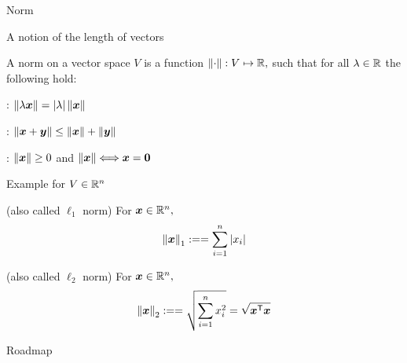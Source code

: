 \documentclass[fleqn,aspectratio=169]{beamer}
\begin{document}
\begin{frame}{Norm}

\plitemsep 0.1in

\bci 
\item A notion of the length of vectors

\item {} A norm on a vector space $V$ is a function $\left \lVert \cdot \right \rVert: V \mapsto {\mathbb R},$ such that for all $\lambda \in {\mathbb R}$ the following hold:

\bci
\item {}: $\left \lVert \lambda \bm{x} \right \rVert = |\lambda| \left \lVert \bm{x} \right \rVert$
\item {}: $\left \lVert \bm{x} + \bm{y} \right \rVert \le \left \lVert \bm{x} \right \rVert + \left \lVert \bm{y} \right \rVert $
\item {}: $\left \lVert \bm{x} \right \rVert \ge 0$ and $\left \lVert \bm{x} \right \rVert \Longleftrightarrow \bm{x} = \bm{0}$
\eci
\eci
\end{frame}

\begin{frame}{Example for $V \in {\mathbb R}^n$}

\plitemsep 0.1in

\bci 
\item {} (also called $\ell_1$ norm) For $\bm{x} \in {\mathbb R}^n,$
$$
\left \lVert \bm{x} \right \rVert_1 := = \sum_{i=1}^n |x_i|
$$
\item {} (also called $\ell_2$ norm) For $\bm{x} \in {\mathbb R}^n,$
$$
\left \lVert \bm{x} \right \rVert_2 := = \sqrt{\sum_{i=1}^n x_i^2} = \sqrt{{\bm{x}}^{\mathsf{T}} \bm{x}}
$$

\eci
\end{frame}


\begin{frame}{Roadmap}

\plitemsep 0.1in

\bce[(1)] 
\item {}

\item {}

\item {}

\ece
\end{frame}
\end{document}
